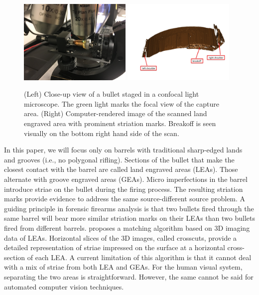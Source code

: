 \documentclass[12pt]{article}
\begin{document}
\begin{figure}

{\centering \includegraphics[width=0.48\textwidth]{./images/microscope-small} \includegraphics[width=0.48\textwidth]{./images/HS44-Br1-B1-L2-annotated} 

}

\caption{\label{microscope}(Left) Close-up view of a bullet staged in a confocal light microscope. The green light marks the focal view of the capture area. (Right) Computer-rendered image of the scanned land engraved area with prominent striation marks. Breakoff is seen visually on the bottom right hand side of the scan.}\label{fig:microscope}
\end{figure}

In this paper, we will focus only on barrels with traditional
sharp-edged lands and grooves (i.e., no polygonal rifling). Sections of
the bullet that make the closest contact with the barrel are called land
engraved areas (LEAs). Those alternate with groove engraved areas
(GEAs). Micro imperfections in the barrel introduce striae on the bullet
during the firing process. The resulting striation marks provide
evidence to address the same source-different source problem. A guiding
principle in forensic firearms analysis is that two bullets fired
through the same barrel will bear more similar striation marks on their
LEAs than two bullets fired from different barrels. \citet{Hare1}
proposes a matching algorithm based on 3D imaging data of LEAs.
Horizontal slices of the 3D images, called crosscuts, provide a detailed
representation of striae impressed on the surface at a horizontal
cross-section of each LEA. A current limitation of this algorithm is
that it cannot deal with a mix of striae from both LEA and GEAs. For the
human visual system, separating the two areas is straightforward.
However, the same cannot be said for automated computer vision
techniques.
\end{document}
